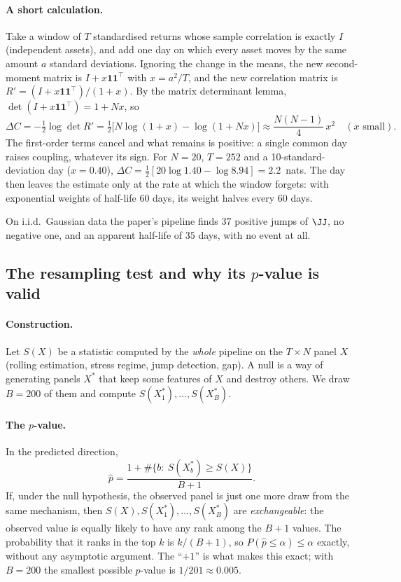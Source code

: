 \paragraph{A short calculation.} Take a window of $T$ standardised returns
whose sample correlation is exactly $I$ (independent assets), and add one day
on which every asset moves by the same amount $a$ standard deviations. Ignoring
the change in the means, the new second-moment matrix is $I+x\mathbf 1\mathbf
1^\top$ with $x=a^2/T$, and the new correlation matrix is
$R'=(I+x\mathbf 1\mathbf 1^\top)/(1+x)$. By the matrix determinant lemma,
$\det(I+x\mathbf 1\mathbf 1^\top)=1+Nx$, so
\[
\Delta C=-\tfrac12\log\det R'=\tfrac12\bigl[N\log(1+x)-\log(1+Nx)\bigr]
\approx\frac{N(N-1)}{4}\,x^2\quad(x\text{ small}).
\]
The first-order terms cancel and what remains is positive: a single common day
raises coupling, whatever its sign. For $N=20$, $T=252$ and a 10-standard-deviation
day ($x=0.40$), $\Delta C=\tfrac12[20\log1.40-\log8.94]=2.2$~nats. The day then
leaves the estimate only at the rate at which the window forgets: with
exponential weights of half-life 60 days, its weight halves every 60 days.

On i.i.d.\ Gaussian data the paper's pipeline finds $37$ positive jumps of
$\JJ$, no negative one, and an apparent half-life of $35$ days, with no event
at all.

\subsection{The resampling test and why its $p$-value is valid}

\paragraph{Construction.} Let $S(X)$ be a statistic computed by the
\emph{whole} pipeline on the $T\times N$ panel $X$ (rolling estimation, stress
regime, jump detection, gap). A null is a way of generating panels $X^*$ that
keep some features of $X$ and destroy others. We draw $B=200$ of them and
compute $S(X^*_1),\dots,S(X^*_B)$.

\paragraph{The $p$-value.} In the predicted direction,
\[
\hat p=\frac{1+\#\{b:\ S(X^*_b)\ge S(X)\}}{B+1}.
\]
If, under the null hypothesis, the observed panel is just one more draw from
the same mechanism, then $S(X),S(X^*_1),\dots,S(X^*_B)$ are
\emph{exchangeable}: the observed value is equally likely to have any rank
among the $B+1$ values. The probability that it ranks in the top $k$ is
$k/(B+1)$, so $P(\hat p\le\alpha)\le\alpha$ exactly, without any asymptotic
argument. The ``$+1$'' is what makes this exact; with $B=200$ the smallest
possible $p$-value is $1/201\approx0.005$.

